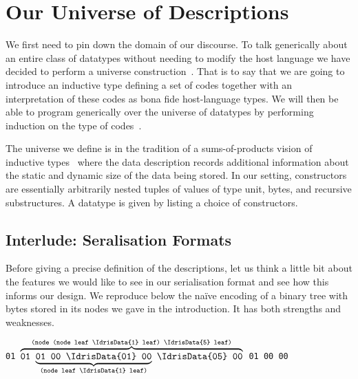 \section{Our Universe of Descriptions}\label{sec:desc}

We first need to pin down the domain of our discourse.
%
To talk generically about an entire class of datatypes
without needing to modify the host language
we have decided to perform a universe
construction~\citep{DBLP:journals/njc/BenkeDJ03, DBLP:phd/ethos/Morris07, DBLP:conf/icfp/LohM11}.
%
That is to say that we are going to introduce an inductive type
defining a set of codes together
with an interpretation of these codes as bona fide
host-language types.
%
We will then be able to program generically over the universe of
datatypes by performing induction on the type of
codes~\citep{DBLP:conf/tphol/PfeiferR99}.

The universe we define is in the tradition of
a sums-of-products vision of inductive types~\citep{DBLP:conf/popl/JanssonJ97}
where the data description records additional information about
the static and dynamic size of the data being stored.
%
In our setting, constructors are essentially arbitrarily nested tuples of
values of type unit,
bytes,
and recursive substructures.
%
A datatype is given by listing a choice of constructors.

\subsection{Interlude: Seralisation Formats}

Before giving a precise definition of the descriptions, let us think
a little bit about the features we would like to see in our serialisation
format and see how this informs our design.
%
We reproduce below the naïve encoding of a binary tree with bytes stored
in its nodes we gave in the introduction. It has both strengths and
weaknesses.

\begin{center}
  \usestt
      \texttt{01 $\overbrace{\texttt{01 $\underbrace{\texttt{01 00 \IdrisData{01} 00}}_{\texttt{(node leaf \IdrisData{1} leaf)}}$
    \IdrisData{05} 00}}^{\texttt{(node (node leaf \IdrisData{1} leaf) \IdrisData{5} leaf)}}$
     01 00  00}
\end{center}

